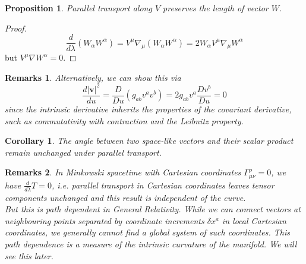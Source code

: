\documentclass[a4paper]{article}
\newtheorem{remarks}{Remarks}[section]
\theoremstyle{new}
\newtheorem{prop}{Proposition}[section]
\newtheorem{cor}{Corollary}[section]
\begin{document}
\begin{prop}
Parallel transport along $V$ preserves the length of vector $W$.
\end{prop}
\begin{proof}
$$\frac{d}{d\lambda}(W_\alpha W^\alpha)=V^\mu\nabla_\mu(W_\alpha W^\alpha)=2W_\alpha V^\mu\nabla_\mu W^\alpha$$
but $V^\mu\nabla W^\alpha=0$.
\end{proof}
\begin{remarks}
Alternatively, we can show this via
$$\frac{d|\mathbf{v}|^2}{du}=\frac{D}{Du}(g_{ab}v^av^b)=2g_{ab}v^a\frac{Dv^b}{Du}=0$$
since the intrinsic derivative inherits the properties of the covariant derivative, such as commutativity with contraction and the Leibnitz property.
\end{remarks}
\begin{cor}
The angle between two space-like vectors and their scalar product remain unchanged under parallel transport.
\end{cor}
\begin{remarks}
In Minkowski spacetime with Cartesian coordinates $\Gamma_{\mu\nu}^\rho=0$, we have $\frac{d}{d\lambda}T=0$, i.e. parallel transport in Cartesian coordinates leaves tensor components unchanged and this result is independent of the curve.\\[5pt]
But this is path dependent in General Relativity. While we can connect vectors at neighbouring points separated by coordinate increments $\delta x^a$ in local Cartesian coordinates, we generally cannot find a global system of such coordinates. This path dependence is a measure of the intrinsic curvature of the manifold. We will see this later.
\end{remarks}
\newpage
\end{document}
